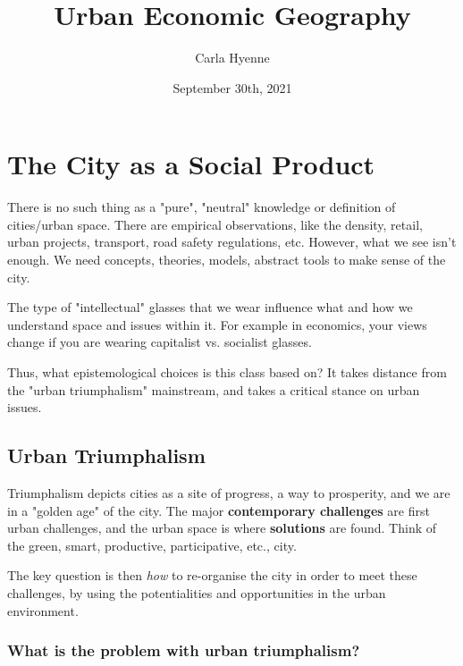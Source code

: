 \documentclass{article}
\title{Urban Economic Geography}
\author{Carla Hyenne }
\begin{document}
\maketitle

\tableofcontents

\pagebreak


\section{The City as a Social Product}
\date{September 30th, 2021}

There is no such thing as a "pure", "neutral" knowledge or definition of cities/urban space. There are empirical observations, like the density, retail, urban projects, transport, road safety regulations, etc. However, what we see isn't enough. We need concepts, theories, models, abstract tools to make sense of the city.

The type of "intellectual" glasses that we wear influence what and how we understand space and issues within it. For example in economics, your views change if you are wearing capitalist vs. socialist glasses.

Thus, what epistemological choices is this class based on? It takes distance from the "urban triumphalism" mainstream, and takes a critical stance on urban issues. 

\subsection{Urban Triumphalism}

Triumphalism depicts cities as a site of progress, a way to prosperity, and we are in a "golden age" of the city. The major \textbf{contemporary challenges} are first urban challenges, and the urban space is where \textbf{solutions} are found. Think of the green, smart, productive, participative, etc., city. 

The key question is then \textit{how} to re-organise the city in order to meet these challenges, by using the potentialities and opportunities in the urban environment. 

\subsubsection{What is the problem with urban triumphalism?}
\end{document}
